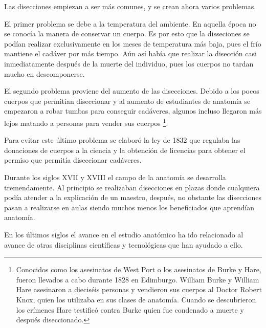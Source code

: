 Las disecciones empiezan a ser más comunes, y se crean ahora varios problemas.

El primer problema se debe a la temperatura del ambiente. En aquella época no se conocía la manera de conservar un cuerpo. Es por esto que la disseciones se podían realizar exclusivamente en los meses de temperatura más baja, pues el frío mantiene el cadáver por más tiempo. Aún así había que realizar la disección casi inmediatamente después de la muerte del individuo, pues los cuerpos no tardan mucho en descomponerse.

El segundo problema proviene del aumento de las disecciones. Debido a los pocos cuerpos que permitían diseccionar y al aumento de estudiantes de anatomía se empezaron a robar tumbas para conseguir cadáveres, algunos incluso llegaron más lejos matando a personas para vender sus cuerpos \footnote{Conocidos como los asesinatos de West Port o los asesinatos de Burke y Hare, fueron llevados a cabo durante 1828 en Edimburgo. William Burke y William Hare asesinaron a dieciséis personas y vendieron sus cuerpos al Doctor Robert Knox, quien los utilizaba en sus clases de anatomía. Cuando se descubrieron los crímenes Hare testificó contra Burke quien fue condenado a muerte y después diseccionado.}.

Para evitar este último problema se elaboró la ley de 1832 que regulaba las donaciones de cuerpos a la ciencia y la obtención de licencias para obtener el permiso que permitía diseccionar cadáveres.

Durante los siglos XVII y XVIII el campo de la anatomía se desarrolla tremendamente. Al principio se realizaban disecciones en plazas donde cualquiera podía atender a la explicación de un maestro, después, no obstante las disecciones pasan a realizarse en aulas siendo muchos menos los beneficiados que aprendían anatomía.

En los últimos siglos el avance en el estudio anatómico ha ido relacionado al avance de otras disciplinas científicas y tecnológicas que han ayudado a ello.
